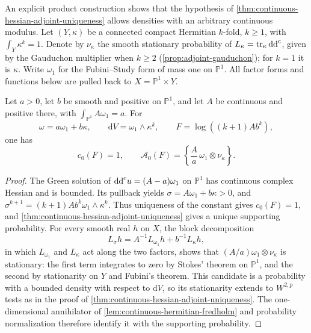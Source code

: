 An explicit product construction shows that the hypothesis of
\cref{thm:continuous-hessian-adjoint-uniqueness} allows densities with an
arbitrary continuous modulus. Let $(Y,\kappa)$ be a connected
compact Hermitian $k$-fold, $k\geq1$, with $\int_Y\kappa^k=1$.
Denote by $\nu_\kappa$ the smooth stationary probability of
$L_\kappa=\operatorname{tr}_\kappa\mathrm{dd}^{\mathrm{c}}$, given by the Gauduchon multiplier
when $k\geq2$ (\cref{prop:adjoint-gauduchon}); for $k=1$ it is $\kappa$.
Write $\omega_1$ for the Fubini--Study form of mass one on $\mathbb P^1$.
All factor forms and functions below are pulled back to
$X=\mathbb P^1\times Y$.

\begin{proposition}\label{prop:continuous-product-adjoint}
Let $a>0$, let $b$ be smooth and positive on $\mathbb P^1$, and let $A$
be continuous and positive there, with $\int_{\mathbb P^1}A\omega_1=a$.
For
\[
 \omega=a\omega_1+b\kappa,\qquad \mathrm dV=\omega_1\wedge\kappa^k,
 \qquad F=\log((k+1)Ab^k),
\]
one has
\[
 c_0(F)=1,\qquad
 \mathcal A_0(F)=\left\{\frac Aa\,\omega_1\otimes\nu_\kappa\right\}.
\]
\end{proposition}
\begin{proof}
The Green solution of $\mathrm{dd}^{\mathrm{c}} u=(A-a)\omega_1$ on $\mathbb P^1$ has
continuous complex Hessian and is bounded. Its pullback yields
$\sigma=A\omega_1+b\kappa>0$, and
$\sigma^{k+1}=(k+1)Ab^k\omega_1\wedge\kappa^k$.
Thus uniqueness of the constant gives $c_0(F)=1$, and
\cref{thm:continuous-hessian-adjoint-uniqueness} gives a unique
supporting probability. For every smooth real $h$ on $X$, the block
decomposition
\[
 L_\sigma h=A^{-1}L_{\omega_1}h+b^{-1}L_\kappa h,
\]
in which $L_{\omega_1}$ and $L_\kappa$ act along the two factors, shows
that $(A/a)\omega_1\otimes\nu_\kappa$ is stationary: the first term
integrates to zero by Stokes' theorem on $\mathbb P^1$, and the second by
stationarity on $Y$ and Fubini's theorem. This candidate is a probability
with a bounded density with respect to $\mathrm dV$, so its stationarity
extends to $W^{2,p}$ tests as in the proof of
\cref{thm:continuous-hessian-adjoint-uniqueness}. The one-dimensional
annihilator of \cref{lem:continuous-hermitian-fredholm} and probability
normalization therefore identify it with the supporting probability.
\end{proof}

